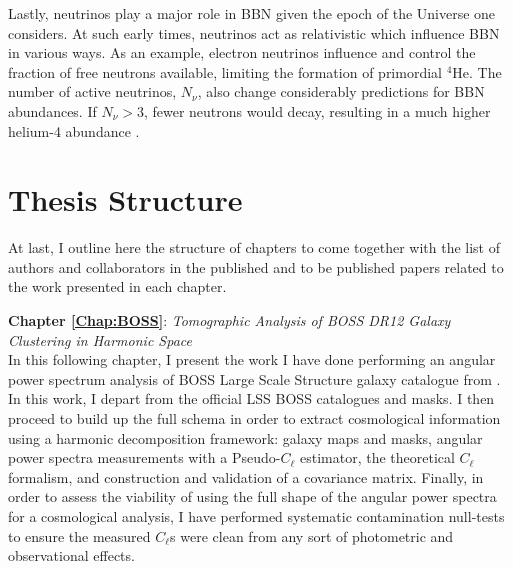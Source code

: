 \qquad Lastly, neutrinos play a major role in BBN given the epoch of the 
Universe one considers. At such early times, neutrinos act as relativistic which influence BBN in various ways. As an example, electron neutrinos influence and control the fraction of free neutrons available, limiting the formation of primordial $^4$He. The number of active neutrinos, $N_{\nu}$, also change considerably predictions for BBN abundances. If $N_{\nu} > 3$, fewer neutrons would decay, resulting in a much higher helium-4 abundance \citep{2007Steingman-BBN,schneider_2016}.



\section{Thesis Structure}
\label{sec:intro:structure}
At last, I outline here the structure of chapters to come together with the list of authors and collaborators in the published and to be published papers related to the work presented in each chapter.

\textbf{Chapter \ref{Chap:BOSS}}: \textit{Tomographic Analysis of BOSS DR12 Galaxy Clustering in Harmonic Space} \\[0.6em]
In this following chapter, I present the work I have done performing an angular power spectrum analysis of BOSS Large Scale Structure galaxy catalogue from \cite{BOSSCatalogue2016}. In this work, I depart from the official LSS BOSS catalogues and masks. I then proceed to build up the full schema in order to extract cosmological information using a harmonic decomposition framework: galaxy maps and masks, angular power spectra measurements with a Pseudo-$C_{\ell}$ estimator, the theoretical $C_{\ell}$ formalism, and construction and validation of a covariance matrix. Finally, in order to assess the viability of using the full shape of the angular power spectra for a cosmological analysis, I have performed systematic contamination null-tests to ensure the measured $C_{\ell}$s were clean from any sort of photometric and observational effects.

